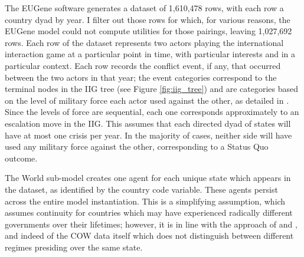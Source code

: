 The EUGene software generates a dataset of 1,610,478 rows, with each row a country dyad by year. I filter out those rows for which, for various reasons, the EUGene model could not compute utilities for those pairings, leaving 1,027,692 rows. Each row of the dataset represents two actors playing the international interaction game at a particular point in time, with particular interests and in a particular context. Each row records the conflict event, if any, that occurred between the two actors in that year; the event categories correspond to the terminal nodes in the IIG tree (see Figure \ref{fig:iig_tree}) and are categories based on the level of military force each actor used against the other, as detailed in \citet{bennett_2000b}. Since the levels of force are sequential, each one corresponds approximately to an escalation move in the IIG. This assumes that each directed dyad of states will have at most one crisis per year. In the majority of cases, neither side will have used any military force against the other, corresponding to a Status Quo outcome.

The World sub-model creates one agent for each unique state which appears in the dataset, as identified by the country code variable. These agents persist across the entire model instantiation. This is a simplifying assumption, which assumes continuity for countries which may have experienced radically different governments over their lifetimes; however, it is in line with the approach of \citet{bdm_1992} and \citet{bennett_2000}, and indeed of the COW data itself which does not distinguish between different regimes presiding over the same state.

